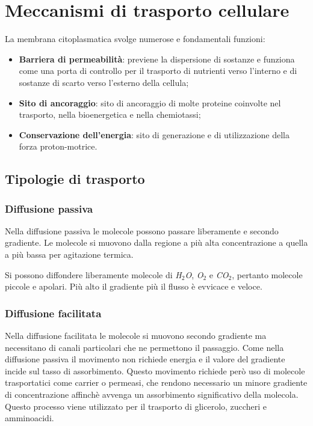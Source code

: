 \chapter{Meccanismi di trasporto cellulare}
La membrana citoplasmatica svolge numerose e fondamentali funzioni: 
\begin{itemize}
    \item \textbf{Barriera di permeabilit\`a}: previene la dispersione di sostanze e funziona come una porta di controllo per il trasporto di nutrienti verso l'interno e di sostanze di scarto verso l'esterno della cellula; 
    \item \textbf{Sito di ancoraggio}: sito di ancoraggio di molte proteine coinvolte nel trasporto, nella bioenergetica e nella chemiotassi; 
    \item \textbf{Conservazione dell'energia}: sito di generazione e di utilizzazione della forza proton-motrice.
\end{itemize}

\section{Tipologie di trasporto}
	
	\subsection{Diffusione passiva}
	Nella diffusione passiva le molecole possono passare liberamente e secondo gradiente.
	Le molecole si muovono dalla regione a pi\`u alta concentrazione a quella a pi\`u bassa per agitazione termica. 

	Si possono diffondere liberamente molecole di \emph{H$_2$O}, \emph{O$_2$} e \emph{CO$_2$}, pertanto molecole piccole e apolari.
	Pi\`u alto il gradiente pi\`u il flusso \`e evvicace e veloce.	


	\subsection{Diffusione facilitata}
	Nella diffusione facilitata le molecole si muovono secondo gradiente ma necessitano di canali particolari che ne permettono il passaggio.
	Come nella diffusione passiva il movimento non richiede energia e il valore del gradiente incide sul tasso di assorbimento.
	Questo movimento richiede per\`o uso di molecole trasportatici come carrier o permeasi, che rendono necessario un minore gradiente di concentrazione affinch\`e avvenga un assorbimento significativo della molecola.
	Questo processo viene utilizzato per il trasporto di glicerolo, zuccheri e amminoacidi.

